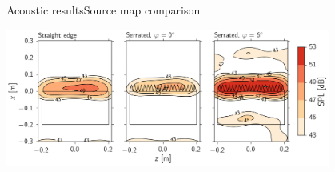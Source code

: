 \documentclass[xcolor=table,aspectratio=169]{beamer}
\begin{document}
\begin{frame}{Acoustic results}{Source map comparison}

    \vspace{1cm}
    \centering
    \includegraphics[width=0.8\textwidth]{scripts/acoustics/results/SourceMap.png}
    
\end{frame}
\end{document}
